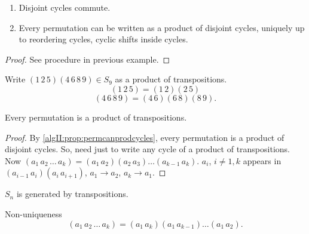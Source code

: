 \documentclass[10pt, a4paper]{article}
\begin{document}
\begin{proposition}\label{algII:prop:permcanprodcycles}\phantom{}
    \begin{enumerate}[label = (\roman*)]
        \item Disjoint cycles commute.

        \item Every permutation can be written as a product of disjoint cycles,
        uniquely up to reordering cycles,
        cyclic shifts inside cycles.
    \end{enumerate}

    \begin{proof}
        See procedure in previous example.
    \end{proof}
\end{proposition}

\begin{example}
    Write $(1\, 2\, 5)(4\, 6\, 8\, 9) \in S_9$ as a product of transpositions.
    \[
    (1\, 2\, 5) = (1\, 2)(2\, 5)
    \]
    \[
    (4\, 6\, 8\, 9) = (4\, 6)(6\, 8)(8\, 9).
    \]
\end{example}

\begin{proposition}
    Every permutation is a product of transpositions.

    \begin{proof}
        By \autoref{algII:prop:permcanprodcycles},
        every permutation is a product of disjoint cycles.
        So,
        need just to write any cycle of a product of transpositions.
        Now $(a_1\, a_2\, \dotsc\, a_k) = (a_1\, a_2)(a_2\, a_3)\dotsc(a_{k - 1}\, a_k)$.
        $a_i$,
        $i \neq 1, k$ appears in $(a_{i - 1}\, a_i)(a_i\, a_{i + 1})$,
        $a_1 \to a_2$,
        $a_k \to a_1$.
    \end{proof}
\end{proposition}

\begin{corollary}
    $S_n$ is generated by transpositions.
\end{corollary}

\begin{example}
    Non-uniqueness
    \[
    (a_1\, a_2\, \dotsc\, a_k) = (a_1\, a_k)(a_1\, a_{k - 1})\dotsc (a_1\, a_2).
    \]
\end{example}
\end{document}
